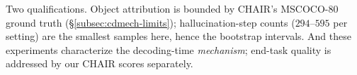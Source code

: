 Two qualifications. Object attribution is bounded by CHAIR's MSCOCO-80 ground
truth (\S\ref{subsec:cdmech-limits}); hallucination-step counts ($294$--$595$ per
setting) are the smallest samples here, hence the bootstrap intervals. And these
experiments characterize the decoding-time \emph{mechanism}; end-task quality is
addressed by our CHAIR scores separately.
